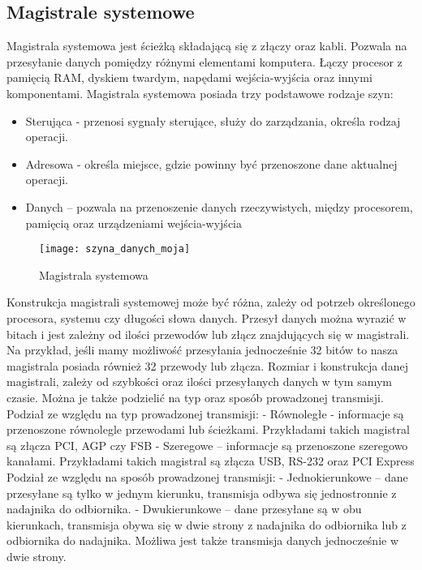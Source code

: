 \documentclass[12pt, a4paper, onside, polish]{article}				%
\begin{document}
\subsection{Magistrale systemowe}
\hspace{\parindent}
Magistrala systemowa jest ścieżką składającą się z złączy oraz kabli. Pozwala na przesyłanie danych pomiędzy różnymi elementami komputera. Łączy procesor z pamięcią RAM, dyskiem twardym, napędami wejścia-wyjścia oraz innymi komponentami.  \newline\newline
Magistrala systemowa posiada trzy podstawowe rodzaje szyn:
\begin{itemize}
\item Sterująca - przenosi sygnały sterujące, służy do zarządzania, określa rodzaj operacji.
\item Adresowa - określa miejsce, gdzie powinny być przenoszone dane aktualnej operacji. 
\item Danych – pozwala na przenoszenie danych rzeczywistych, między procesorem, pamięcią oraz urządzeniami wejścia-wyjścia 
\end{itemize}
\cleardoublepage
 
 
 \begin{figure}[hbt!]
{\centering \texttt{[image: szyna\_danych\_moja]} \caption{Magistrala systemowa}}\vspace{5mm}
\end{figure}


Konstrukcja magistrali systemowej może być różna, zależy od potrzeb określonego procesora, systemu czy długości słowa danych. Przesył danych można wyrazić w bitach i jest zależny od ilości przewodów lub złącz znajdujących się w magistrali. Na przykład, jeśli mamy możliwość przesyłania jednocześnie 32 bitów to nasza magistrala posiada również 32 przewody lub złącza. Rozmiar i konstrukcja danej magistrali, zależy od szybkości oraz ilości przesyłanych danych w tym samym czasie. Można je także podzielić na typ oraz sposób prowadzonej transmisji. \newline \newline
Podział ze względu na typ prowadzonej transmisji: \newline
- Równoległe - informacje są przenoszone równolegle przewodami lub ścieżkami. Przykładami takich magistral są złącza PCI, AGP czy FSB \newline
- Szeregowe – informacje są przenoszone szeregowo kanałami. Przykładami takich magistral są złącza USB, RS-232 oraz PCI Express \newline\newline
Podział ze względu na sposób prowadzonej transmisji: \newline
- Jednokierunkowe – dane przesyłane są tylko w jednym kierunku, transmisja odbywa się jednostronnie z nadajnika do odbiornika. \newline
- Dwukierunkowe – dane przesyłane są w obu kierunkach, transmisja obywa się w dwie strony z nadajnika do odbiornika lub z odbiornika do nadajnika. Możliwa jest także transmisja danych jednocześnie w dwie strony. \newline
 
\end{document}
